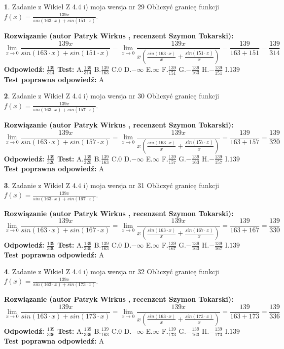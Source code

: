 \documentclass[12pt, a4paper]{article}
\theoremstyle{definition} %
\newtheorem{zad}{}
\newcommand{\zadStart}[1]{\begin{zad}#1\newline}
\newcommand{\zadStop}{\end{zad}}
\newcommand{\rozwStart}[2]{\noindent \textbf{Rozwiązanie (autor #1 , recenzent #2): }\newline}
\newcommand{\rozwStop}{\newline}
\newcommand{\odpStart}{\noindent \textbf{Odpowiedź:}\newline}
\newcommand{\odpStop}{\newline}
\newcommand{\testStart}{\noindent \textbf{Test:}\newline}
\newcommand{\testStop}{\newline}
\newcommand{\kluczStart}{\noindent \textbf{Test poprawna odpowiedź:}\newline}
\newcommand{\kluczStop}{\newline}
\begin{document}
\zadStart{Zadanie z Wikieł Z 4.4 i) moja wersja nr 29}
Obliczyć granicę funkcji $f(x)=\frac{139x}{sin(163\cdot x) +sin(151\cdot x)}$.
\zadStop
\rozwStart{Patryk Wirkus}{Szymon Tokarski}
$$\lim\limits_{x\to 0}\frac{139x}{sin(163\cdot x) +sin(151\cdot x)}=\lim\limits_{x\to 0}\frac{139x}{x(\frac{sin(163\cdot x)}{x}+\frac{sin(151\cdot x)}{x})}=\frac{139}{163+151} = \frac{139}{314}$$
\rozwStop
\odpStart
$\frac{139}{314}$
\odpStop
\testStart
A.$\frac{139}{314}$
B.$\frac{139}{163}$
C.$0$
D.$-\infty$
E.$\infty$
F.$\frac{139}{151}$
G.$-\frac{139}{163}$
H.$-\frac{139}{151}$
I.$139$
\testStop
\kluczStart
A
\kluczStop



\zadStart{Zadanie z Wikieł Z 4.4 i) moja wersja nr 30}
Obliczyć granicę funkcji $f(x)=\frac{139x}{sin(163\cdot x) +sin(157\cdot x)}$.
\zadStop
\rozwStart{Patryk Wirkus}{Szymon Tokarski}
$$\lim\limits_{x\to 0}\frac{139x}{sin(163\cdot x) +sin(157\cdot x)}=\lim\limits_{x\to 0}\frac{139x}{x(\frac{sin(163\cdot x)}{x}+\frac{sin(157\cdot x)}{x})}=\frac{139}{163+157} = \frac{139}{320}$$
\rozwStop
\odpStart
$\frac{139}{320}$
\odpStop
\testStart
A.$\frac{139}{320}$
B.$\frac{139}{163}$
C.$0$
D.$-\infty$
E.$\infty$
F.$\frac{139}{157}$
G.$-\frac{139}{163}$
H.$-\frac{139}{157}$
I.$139$
\testStop
\kluczStart
A
\kluczStop



\zadStart{Zadanie z Wikieł Z 4.4 i) moja wersja nr 31}
Obliczyć granicę funkcji $f(x)=\frac{139x}{sin(163\cdot x) +sin(167\cdot x)}$.
\zadStop
\rozwStart{Patryk Wirkus}{Szymon Tokarski}
$$\lim\limits_{x\to 0}\frac{139x}{sin(163\cdot x) +sin(167\cdot x)}=\lim\limits_{x\to 0}\frac{139x}{x(\frac{sin(163\cdot x)}{x}+\frac{sin(167\cdot x)}{x})}=\frac{139}{163+167} = \frac{139}{330}$$
\rozwStop
\odpStart
$\frac{139}{330}$
\odpStop
\testStart
A.$\frac{139}{330}$
B.$\frac{139}{163}$
C.$0$
D.$-\infty$
E.$\infty$
F.$\frac{139}{167}$
G.$-\frac{139}{163}$
H.$-\frac{139}{167}$
I.$139$
\testStop
\kluczStart
A
\kluczStop



\zadStart{Zadanie z Wikieł Z 4.4 i) moja wersja nr 32}
Obliczyć granicę funkcji $f(x)=\frac{139x}{sin(163\cdot x) +sin(173\cdot x)}$.
\zadStop
\rozwStart{Patryk Wirkus}{Szymon Tokarski}
$$\lim\limits_{x\to 0}\frac{139x}{sin(163\cdot x) +sin(173\cdot x)}=\lim\limits_{x\to 0}\frac{139x}{x(\frac{sin(163\cdot x)}{x}+\frac{sin(173\cdot x)}{x})}=\frac{139}{163+173} = \frac{139}{336}$$
\rozwStop
\odpStart
$\frac{139}{336}$
\odpStop
\testStart
A.$\frac{139}{336}$
B.$\frac{139}{163}$
C.$0$
D.$-\infty$
E.$\infty$
F.$\frac{139}{173}$
G.$-\frac{139}{163}$
H.$-\frac{139}{173}$
I.$139$
\testStop
\kluczStart
A
\kluczStop
\end{document}

